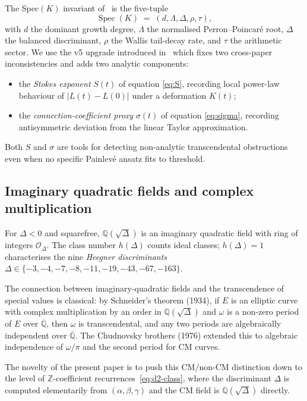 \documentclass[11pt,reqno]{amsart}
\theoremstyle{definition}
\DeclareMathOperator{\Spec}{Spec}
\begin{document}
The Spec$(K)$ invariant of~\cite{Papanokechi2026Spec} is the
five-tuple
\begin{equation}\label{eq:speck}
\Spec(K) \;=\; (d, \Lambda, \Delta, \rho, \tau),
\end{equation}
with $d$ the dominant growth degree, $\Lambda$ the normalised
Perron--Poincar\'e root, $\Delta$ the balanced discriminant,
$\rho$ the Wallis tail-decay rate, and $\tau$ the arithmetic
sector. We use the v5 upgrade introduced
in~\cite{Papanokechi2026Spec} which fixes two cross-paper
inconsistencies and adds two analytic components:
\begin{itemize}
\item the \emph{Stokes exponent} $S(t)$ of equation
\eqref{eq:S}, recording local power-law behaviour of
$|L(t)-L(0)|$ under a deformation $K(t)$;
\item the \emph{connection-coefficient proxy} $\sigma(t)$ of
equation \eqref{eq:sigma}, recording antisymmetric deviation
from the linear Taylor approximation.
\end{itemize}
Both $S$ and $\sigma$ are tools for detecting non-analytic
transcendental obstructions even when no specific Painlev\'e
ansatz fits to threshold.

\subsection{Imaginary quadratic fields and complex multiplication}
\label{ssec:cm}

For $\Delta<0$ and squarefree, $\mathbb{Q}(\sqrt{\Delta})$ is an
imaginary quadratic field with ring of integers
$\mathcal{O}_{\Delta}$. The class number $h(\Delta)$ counts
ideal classes; $h(\Delta)=1$ characterises the nine \emph{Heegner
discriminants}
$\Delta\in\{-3,-4,-7,-8,-11,-19,-43,-67,-163\}$.

The connection between imaginary-quadratic fields and the
transcendence of special values is classical: by Schneider's
theorem (1934), if $E$ is an elliptic curve with complex
multiplication by an order in
$\mathbb{Q}(\sqrt{\Delta})$ and $\omega$ is a non-zero period of
$E$ over $\overline{\mathbb{Q}}$, then $\omega$ is transcendental,
and any two periods are algebraically independent over
$\overline{\mathbb{Q}}$. The Chudnovsky brothers (1976) extended
this to algebraic independence of $\omega/\pi$ and the second
period for CM curves.

The novelty of the present paper is to push this CM/non-CM
distinction down to the level of $\mathbb{Z}$-coefficient
recurrences~\eqref{eq:d2-class}, where the discriminant
$\Delta$ is computed elementarily from $(\alpha,\beta,\gamma)$
and the CM field is $\mathbb{Q}(\sqrt{\Delta})$ directly.
\end{document}
